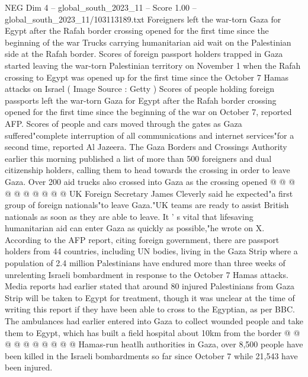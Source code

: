 \begin{textsample}{NEG Dim 4 – global\_south\_2023\_11 – Score 1.00 – global\_south\_2023\_11/103113189.txt}  \label{ex:f4_neg_306}
Foreigners left the war-torn Gaza for Egypt after the Rafah border crossing opened for the first time since the beginning of the war Trucks carrying humanitarian aid wait on the Palestinian side at the Rafah border.
Scores of foreign passport holders trapped in Gaza started leaving the war-torn Palestinian territory on November 1 when the Rafah crossing to Egypt was opened up for the first time since the October 7 Hamas attacks on Israel ( Image Source : Getty ) Scores of people holding foreign passports left the war-torn Gaza for Egypt after the Rafah border crossing opened for the first time since the beginning of the war on October 7, reported AFP.
Scores of people and cars moved through the gates as Gaza suffered"complete interruption of all communications and internet services"for a second time, reported Al Jazeera.
The Gaza Borders and Crossings Authority earlier this morning published a list of more than 500 foreigners and dual citizenship holders, calling them to head towards the crossing in order to leave Gaza.
Over 200 aid trucks also crossed into Gaza as the crossing opened @ @ @ @ @ @ @ @ @ @ UK Foreign Secretary James Cleverly said he expected"a first group of foreign nationals"to leave Gaza."UK teams are ready to assist British nationals as soon as they are able to leave.
It ' s vital that lifesaving humanitarian aid can enter Gaza as quickly as possible,"he wrote on X.
According to the AFP report, citing foreign government, there are passport holders from 44 countries, including UN bodies, living in the Gaza Strip where a population of 2.4 million Palestinians have endured more than three weeks of unrelenting Israeli bombardment in response to the October 7 Hamas attacks.
Media reports had earlier stated that around 80 injured Palestinians from Gaza Strip will be taken to Egypt for treatment, though it was unclear at the time of writing this report if they have been able to cross to the Egyptian, as per BBC.
The ambulances had earlier entered into Gaza to collect wounded people and take them to Egypt, which has built a field hospital about 10km from the border @ @ @ @ @ @ @ @ @ @ Hamas-run heatlh authorities in Gaza, over 8,500 people have been killed in the Israeli bombardments so far since October 7 while 21,543 have been injured.

\end{textsample}
